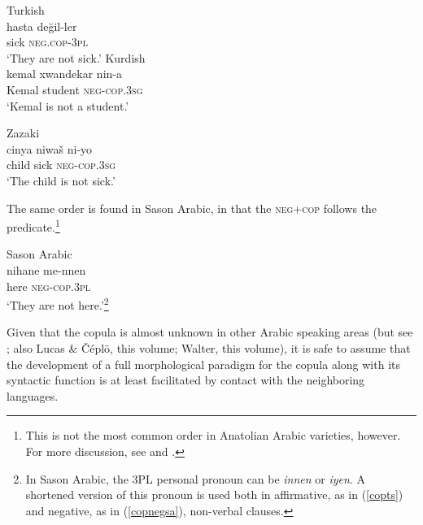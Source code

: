 \documentclass[output=paper]{langsci/langscibook}
\begin{document}
\begin{exe}
\ex \label{copneg} 
		\begin{xlist}
		\ex Turkish \\\label{copnegtk}\gll hasta 	değil-ler		\\
    sick	\textsc{neg.cop-3pl} \\
       \glt `They are not sick.'
	\ex Kurdish \\\label{copnegkr}  \gll kemal	xwandekar  	nin-a	 \\
    Kemal	student		\textsc{neg-cop.3sg}\\
    \glt    `Kemal is not a student.'
    
        
		\ex Zazaki \\ \label{copnegza} \gll  cinya 	niwaš   ni-yo\\
        child	sick	\textsc{neg-cop.3sg} \\
        \glt `The child is not sick.'
        \end{xlist}
      
\end{exe}

\noindent  The same order is found in Sason Arabic, in that the \textsc{neg+cop} follows the predicate.\footnote{This is not the most common order in Anatolian Arabic varieties, however. For more discussion, see \cite{Jastrow2011anatolian} and \cite{Akkus2016,Akkus2017}.} 

\begin{exe}
\ex Sason Arabic \\ \label{copnegsa} \gll  nihane me-nnen	\\
        here 	\textsc{neg-cop.3pl} \\
        \glt `They  are not here.'\footnote{In Sason Arabic, the 3PL personal pronoun can be \textit{innen} or \textit{iyen}. A shortened version of this pronoun is used both in affirmative, as in (\ref{copts}) and negative, as in (\ref{copnegsa}), non-verbal clauses. }
\end{exe}
	
\noindent Given that the copula is almost unknown in other Arabic speaking areas (but see \citealt{Blanc1964}; also Lucas \& Čéplö, this volume; Walter, this volume), it is safe to assume that the development of a full morphological paradigm for the copula along with its syntactic function is at least facilitated by contact with the neighboring languages.
\end{document}
